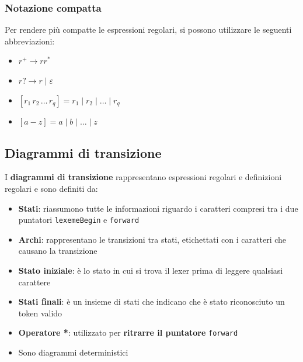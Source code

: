 \documentclass[a4paper]{article}
\begin{document}
\subsubsection{Notazione compatta}
Per rendere più compatte le espressioni regolari, si possono utilizzare le seguenti
abbreviazioni:
\begin{itemize}
  \item \( r^+ \to rr^* \) 
  \item \( r? \to r \mid \varepsilon  \) 
  \item \( \left[ r_1 \, r_2 \, \ldots \, r_q  \right] = r_1 \mid r_2 \mid \ldots \mid r_q \)
  \item \( \left[ a - z \right] = a \mid b \mid \ldots \mid z \)
\end{itemize}

\subsection{Diagrammi di transizione}
I \textbf{diagrammi di transizione} rappresentano espressioni regolari e definizioni
regolari e sono definiti da:
\begin{itemize}
  \item \textbf{Stati}: riassumono tutte le informazioni riguardo i caratteri compresi
    tra i due puntatori \texttt{lexemeBegin} e \texttt{forward}

  \item \textbf{Archi}: rappresentano le transizioni tra stati, etichettati con i
    caratteri che causano la transizione

  \item \textbf{Stato iniziale}: è lo stato in cui si trova il lexer prima di leggere
    qualsiasi carattere

  \item \textbf{Stati finali}: è un insieme di stati che indicano che è stato
    riconosciuto un token valido

  \item \textbf{Operatore *}: utilizzato per \textbf{ritrarre il puntatore}
    \texttt{forward} 

  \item Sono diagrammi deterministici
\end{itemize}
\end{document}
